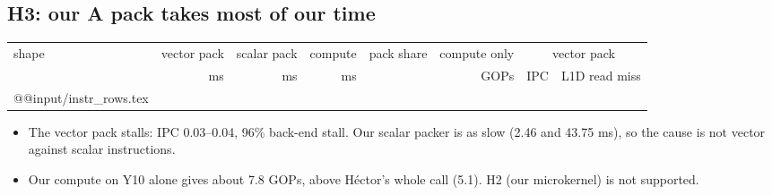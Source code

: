 \subsection{H3: our A pack takes most of our time}
\begin{center}\small\setlength\tabcolsep{4pt}
\begin{tabular}{@{}l rrr r r rr@{}}
\toprule
shape & vector pack & scalar pack & compute & pack share & compute only & \multicolumn{2}{c}{vector pack} \\
 & ms & ms & ms & & GOPs & IPC & L1D read miss \\
\midrule
\csname @@input\endcsname \F/instr_rows.tex
\bottomrule
\end{tabular}
\end{center}
\begin{itemize}\setlength\itemsep{1pt}
\item The vector pack stalls: IPC 0.03--0.04, 96\% back-end stall. Our scalar packer is as slow (2.46 and 43.75 ms), so the cause is not vector against scalar instructions.
\item Our compute on Y10 alone gives about 7.8 GOPs, above H\'ector's whole call (5.1). H2 (our microkernel) is not supported.
\end{itemize}

